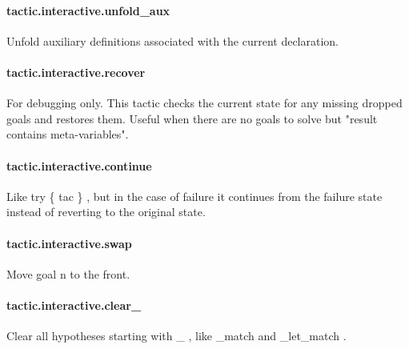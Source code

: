 \documentclass{article}
\begin{document}
\paragraph{tactic.interactive.unfold\_aux}
\par
Unfold auxiliary definitions associated with the current declaration.
\paragraph{tactic.interactive.recover}
\par
For debugging only. This tactic checks the current state for any
missing dropped goals and restores them. Useful when there are no
goals to solve but "result contains meta-variables".
\paragraph{tactic.interactive.continue}
\par
Like 
\colorbox[RGB]{253,246,227}{{{{\color[RGB]{101, 123, 131} try \{ tac \} }}}}, but in the case of failure it continues
from the failure state instead of reverting to the original state.
\paragraph{tactic.interactive.swap}
\par
Move goal 
\colorbox[RGB]{253,246,227}{{{{\color[RGB]{101, 123, 131} n }}}} to the front.
\paragraph{tactic.interactive.clear\_}
\par
Clear all hypotheses starting with 
\colorbox[RGB]{253,246,227}{{{{\color[RGB]{101, 123, 131} \_ }}}}, like 
\colorbox[RGB]{253,246,227}{{{{\color[RGB]{101, 123, 131} \_match }}}} and 
\colorbox[RGB]{253,246,227}{{{{\color[RGB]{101, 123, 131} \_let\_match }}}}.
\end{document}
